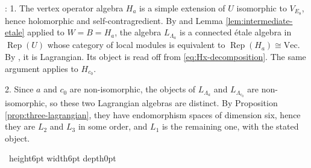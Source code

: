 \documentclass[leqno]{article}
\newcommand{\qed}{\hfill \vrule height6pt  width6pt depth0pt}
\DeclareMathOperator{\Rep}{Rep} %
\newenvironment{proof}[1][]{\noindent {\it Proof #1} : }{\hbox{~}\qed
\smallskip
}
\numberwithin{equation}{section}
\begin{document}
\begin{proof}
1. The vertex operator algebra $H_a$ is a simple extension of $U$ isomorphic to $V_{E_8}$, hence holomorphic and self-contragredient. By \cite[Theorems 3.2 and 3.4 pp.~10 and 16]{HKL15} and Lemma \ref{lem:intermediate-etale} applied to $W = B = H_a$, the algebra $L_{\Lambda_a}$ is a connected \'etale algebra in $\Rep(U)$ whose category of local modules is equivalent to $\Rep(H_a) \cong \mathrm{Vec}$. By \cite[Remark 4.3 p.~16]{DMNO13}, it is Lagrangian. Its object is read off from \eqref{eq:Hx-decomposition}. The same argument applies to $H_{c_0}$.

2. Since $a$ and $c_0$ are non-isomorphic, the objects of $L_{\Lambda_a}$ and $L_{\Lambda_{c_0}}$ are non-isomorphic, so these two Lagrangian algebras are distinct. By Proposition \ref{prop:three-lagrangian}, they have endomorphism spaces of dimension six, hence they are $L_2$ and $L_3$ in some order, and $L_1$ is the remaining one, with the stated object.


\end{proof}
\end{document}
